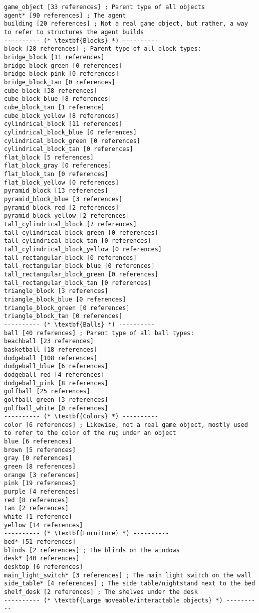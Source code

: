 \documentclass{article}
\begin{document}
\begin{lstlisting}
game_object [33 references] ; Parent type of all objects
agent* [90 references] ; The agent
building [20 references] ; Not a real game object, but rather, a way to refer to structures the agent builds
---------- (* \textbf{Blocks} *) ----------
block [28 references] ; Parent type of all block types:
bridge_block [11 references]
bridge_block_green [0 references]
bridge_block_pink [0 references]
bridge_block_tan [0 references]
cube_block [38 references]
cube_block_blue [8 references]
cube_block_tan [1 reference]
cube_block_yellow [8 references]
cylindrical_block [11 references]
cylindrical_block_blue [0 references]
cylindrical_block_green [0 references]
cylindrical_block_tan [0 references]
flat_block [5 references]
flat_block_gray [0 references]
flat_block_tan [0 references]
flat_block_yellow [0 references]
pyramid_block [13 references]
pyramid_block_blue [3 references]
pyramid_block_red [2 references]
pyramid_block_yellow [2 references]
tall_cylindrical_block [7 references]
tall_cylindrical_block_green [0 references]
tall_cylindrical_block_tan [0 references]
tall_cylindrical_block_yellow [0 references]
tall_rectangular_block [0 references]
tall_rectangular_block_blue [0 references]
tall_rectangular_block_green [0 references]
tall_rectangular_block_tan [0 references]
triangle_block [3 references]
triangle_block_blue [0 references]
triangle_block_green [0 references]
triangle_block_tan [0 references]
---------- (* \textbf{Balls} *) ----------
ball [40 references] ; Parent type of all ball types:
beachball [23 references]
basketball [18 references]
dodgeball [108 references]
dodgeball_blue [6 references]
dodgeball_red [4 references]
dodgeball_pink [8 references]
golfball [25 references]
golfball_green [3 references]
golfball_white [0 references]
---------- (* \textbf{Colors} *) ----------
color [6 references] ; Likewise, not a real game object, mostly used to refer to the color of the rug under an object
blue [6 references]
brown [5 references]
gray [0 references]
green [8 references]
orange [3 references]
pink [19 references]
purple [4 references]
red [8 references]
tan [2 references]
white [1 reference]
yellow [14 references]
---------- (* \textbf{Furniture} *) ----------
bed* [51 references]
blinds [2 references] ; The blinds on the windows
desk* [40 references]
desktop [6 references]
main_light_switch* [3 references] ; The main light switch on the wall
side_table* [4 references] ; The side table/nightstand next to the bed
shelf_desk [2 references] ; The shelves under the desk
---------- (* \textbf{Large moveable/interactable objects} *) ----------

\end{lstlisting}
\end{document}

